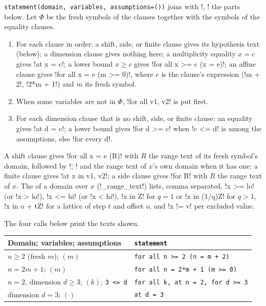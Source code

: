 \begin{definition}\label{def:kernel-statement}
\texttt{statement(\allowbreak{}domain,\allowbreak{} variables,\allowbreak{} assumptions=(\allowbreak{}))} joins with \code!, ! the parts below. Let $\Phi$ be the fresh symbols of the clauses together with the symbols of the equality clauses.
\begin{enumerate}
\item For each clause in order: a shift, side, or finite clause gives its hypothesis text (below); a dimension clause gives nothing here; a multiplicity equality $x=c$ gives \code!at x = c!; a lower bound $x\ge c$ gives \code!for all x >= c (x = e)!; an affine clause gives \code!for all x = e (m >= 0)!, where $e$ is the clause's expression (\code!m + 2!, \code!2*m + 1!) and $m$ its fresh symbol.
\item When some variables are not in $\Phi$, \code!for all v1, v2! is put first.
\item For each dimension clause that is no shift, side, or finite clause: an equality gives \code!at d = c!; a lower bound gives \code!for d >= c! when \code!c <= d! is among the assumptions, else \code!for every d!.
\end{enumerate}
A shift clause gives \code!for all x = e (R)! with $R$ the range text of its fresh symbol's domain, followed by \code!; ! and the range text of $x$'s own domain when it has one; a finite clause gives \code!at x in {v1, v2}!; a side clause gives \code!for R! with $R$ the range text of $x$. The  of a domain over $x$ (\py!_range_text!) lists, comma separated, \code!x >= lo! (or \code!x > lo!), \code!x <= hi! (or \code!x < hi!), \code!x in Z! for $q=1$ or \code!x in (1/q)Z! for $q>1$, \code!x in o + tZ! for a lattice of step $t$ and offset $o$, and \code!x != v! per excluded value.
\end{definition}

\begin{example}[Statements]
The four calls below print the texts shown.
\begin{center}\small
\begin{tabular}{@{}ll@{}}
\toprule
Domain; variables; assumptions & \texttt{statement} \\
\midrule
$n\ge2$ (fresh $m$); $(m)$ & \texttt{for all n >= 2 (n = m + 2)} \\
$n=2m+1$; $(m)$ & \texttt{for all n = 2*m + 1 (m >= 0)} \\
$n=2$, dimension $d\ge3$; $(k)$; \texttt{3 <= d} & \texttt{for all k, at n = 2, for d >= 3} \\
dimension $d=3$; $()$ & \texttt{at d = 3} \\
\bottomrule
\end{tabular}
\end{center}
\end{example}

